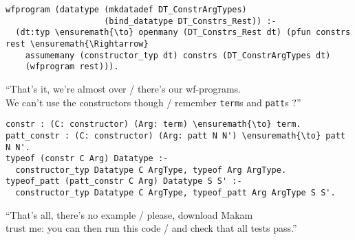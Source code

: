 \begin{verbatim}
wfprogram (datatype (mkdatadef DT_ConstrArgTypes)
                    (bind_datatype DT_Constrs_Rest)) :-
  (dt:typ \ensuremath{\to} openmany (DT_Constrs_Rest dt) (pfun constrs rest \ensuremath{\Rightarrow}
    assumemany (constructor_typ dt) constrs (DT_ConstrArgTypes dt)
    (wfprogram rest))).
\end{verbatim}

\begin{versy}
``That's it, we're almost over / there's our wf-programs. \\
We can't use the constructors though / remember \texttt{term}s and \texttt{patt}s ?''
\end{versy}

\begin{verbatim}
constr : (C: constructor) (Arg: term) \ensuremath{\to} term.
patt_constr : (C: constructor) (Arg: patt N N') \ensuremath{\to} patt N N'.
typeof (constr C Arg) Datatype :-
  constructor_typ Datatype C ArgType, typeof Arg ArgType.
typeof_patt (patt_constr C Arg) Datatype S S' :-
  constructor_typ Datatype C ArgType, typeof_patt Arg ArgType S S'.
\end{verbatim}

\begin{versy}
``That's all, there's no example / please, download Makam \\
trust me: you can then run this code / and check that all tests pass.''
\end{versy}
